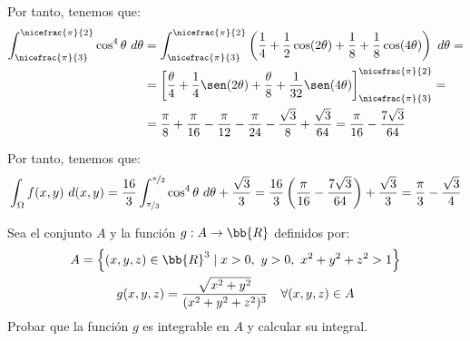 \begin{ejercicio}
    Por tanto, tenemos que:
    \begin{align*}
        \int_{\nicefrac{\pi}{3}}^{\nicefrac{\pi}{2}}\cos^4\theta~d\theta &= \int_{\nicefrac{\pi}{3}}^{\nicefrac{\pi}{2}}\left(\dfrac{1}{4} + \dfrac{1}{2}\cos(2\theta) + \dfrac{1}{8} + \dfrac{1}{8}\cos(4\theta)\right)~d\theta =\\
        &= \left[\dfrac{\theta}{4} + \dfrac{1}{4}\sen(2\theta) + \dfrac{\theta}{8} + \dfrac{1}{32}\sen(4\theta)\right]_{\nicefrac{\pi}{3}}^{\nicefrac{\pi}{2}} =\\
        &= \dfrac{\pi}{8} + \dfrac{\pi}{16} -\dfrac{\pi}{12} - \dfrac{\pi}{24} - \dfrac{\sqrt{3}}{8} + \dfrac{\sqrt{3}}{64}
        = \dfrac{\pi}{16} - \dfrac{7\sqrt{3}}{64}
    \end{align*}

    Por tanto, tenemos que:
    \begin{align*}
        \int_{\Omega} f(x, y)~d(x, y) = \dfrac{16}{3}\int_{\nicefrac{\pi}{3}}^{\nicefrac{\pi}{2}}\cos^4\theta~d\theta + \dfrac{\sqrt{3}}{3} = \dfrac{16}{3}\left(\dfrac{\pi}{16} - \dfrac{7\sqrt{3}}{64}\right) + \dfrac{\sqrt{3}}{3} = \dfrac{\pi}{3} - \dfrac{\sqrt{3}}{4}
    \end{align*}
\end{ejercicio}



\begin{ejercicio}
    Sea el conjunto $A$ y la función $g:A\to \bb{R}$ definidos por:
    \begin{gather*}
        A=\left\{(x,y,z)\in \bb{R}^3 \mid x>0,~y>0,~x^2+y^2+z^2> 1\right\}\\
        g(x,y,z) = \dfrac{\sqrt{x^2+y^2}}{(x^2+y^2+z^2)^{3}} \quad \forall (x,y,z)\in A
    \end{gather*}
    Probar que la función \( g \) es integrable en \( A \) y calcular su integral.
\end{ejercicio}